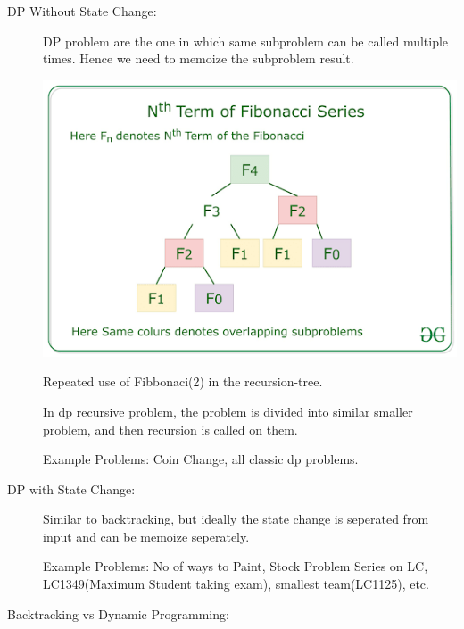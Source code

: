 \begin{description}
    \item [DP Without State Change:] DP problem are the one in which same subproblem can be called multiple times. Hence we need to memoize the subproblem result.
    \begin{marginfigure}
        \includegraphics[width=\marginparwidth]{resources/fibonnaci_repeated_computation.png}
        \caption{Repeated use of Fibbonaci(2) in the recursion-tree.}
    \end{marginfigure}

    In dp recursive problem, the problem is divided into similar smaller problem, and then recursion is called on them.

    Example Problems: Coin Change, all classic dp problems.

    \item [DP with State Change:] Similar to backtracking, but ideally the state change is seperated from input and can be memoize seperately.
    
    Example Problems: No of ways to Paint, Stock Problem Series on LC, LC1349(Maximum Student taking exam), smallest team(LC1125), etc.
\end{description}

\vspace{2cm}
Backtracking vs Dynamic Programming:

